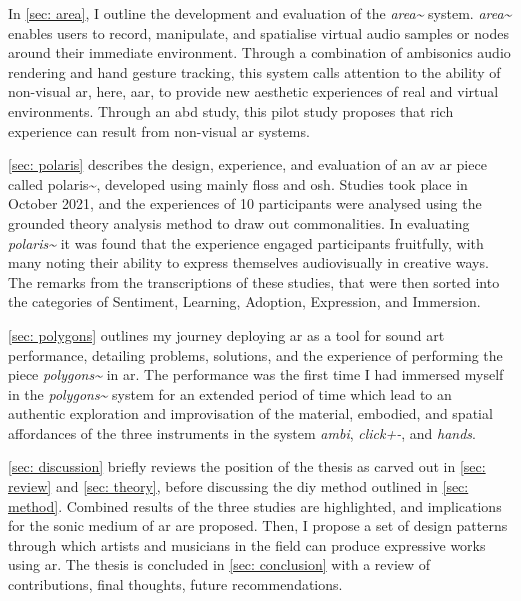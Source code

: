 In \autoref{sec: area}, I outline the development and evaluation of the \textit{area\textasciitilde{}} system. \textit{area\textasciitilde{}} enables users to record, manipulate, and spatialise virtual audio samples or nodes around their immediate environment. Through a combination of ambisonics audio rendering and hand gesture tracking, this system calls attention to the ability of non-visual \gls{ar}, here, \gls{aar}, to provide new aesthetic experiences of real and virtual environments. Through an \gls{abd} study, this pilot study proposes that rich experience can result from non-visual \gls{ar} systems. 

\autoref{sec: polaris} describes the design, experience, and evaluation of an \gls{av} \gls{ar} piece called {polaris\textasciitilde{}}, developed using mainly \gls{floss} and \gls{osh}. Studies took place in October 2021, and the experiences of 10 participants were analysed using the grounded theory analysis method to draw out commonalities. In evaluating \textit{polaris\textasciitilde{}} it was found that the experience engaged participants fruitfully, with many noting their ability to express themselves audiovisually in creative ways. The remarks from the transcriptions of these studies, that were then sorted into the categories of Sentiment, Learning, Adoption, Expression, and Immersion. 

\autoref{sec: polygons} outlines my journey deploying \gls{ar} as a tool for sound \gls{art} performance, detailing problems, solutions, and the experience of performing the piece \textit{polygons\textasciitilde{}} in \gls{ar}. The performance was the first time I had immersed myself in the \textit{polygons\textasciitilde{}} system for an extended period of time which lead to an authentic exploration and improvisation of the material, embodied, and spatial affordances of the three instruments in the system \textit{ambi}, \textit{click+-}, and \textit{hands}.

\autoref{sec: discussion} briefly reviews the position of the thesis as carved out in \autoref{sec: review} and \autoref{sec: theory}, before discussing the \gls{diy} method outlined in \autoref{sec: method}. Combined results of the three studies are highlighted, and implications for the sonic medium of \gls{ar} are proposed. Then, I propose a set of design patterns through which artists and musicians in the field can produce expressive works using \gls{ar}. The thesis is concluded in \autoref{sec: conclusion} with a review of contributions, final thoughts, future recommendations.
\newpage
